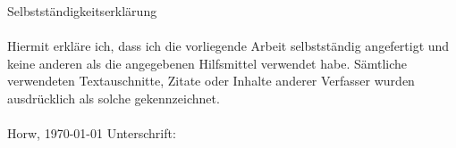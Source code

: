 
\vspace*{25 mm}
{\Large Selbstständigkeitserklärung} \\
\\
Hiermit erkläre ich, dass ich die vorliegende Arbeit selbstständig angefertigt und keine anderen als die angegebenen Hilfsmittel verwendet habe. Sämtliche verwendeten Textauschnitte, Zitate oder Inhalte anderer Verfasser wurden ausdrücklich als solche gekennzeichnet. \\
\\
{\large Horw, \today      \hspace{150pt} Unterschrift:}   


\vspace*{50 mm}     


